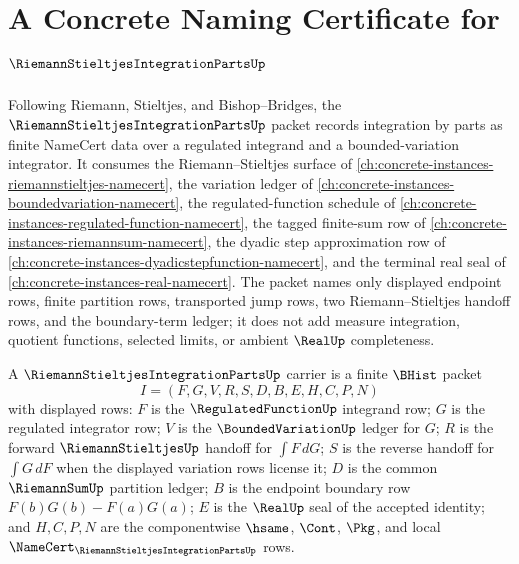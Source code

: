 \chapter{A Concrete Naming Certificate for $\RiemannStieltjesIntegrationPartsUp$}
\label{ch:concrete-instances-riemann-stieltjes-integration-parts-namecert}

Following Riemann, Stieltjes, and Bishop--Bridges, the $\RiemannStieltjesIntegrationPartsUp$ packet records integration by parts as finite NameCert data over a regulated integrand and a bounded-variation integrator. It consumes the Riemann--Stieltjes surface of \autoref{ch:concrete-instances-riemannstieltjes-namecert}, the variation ledger of \autoref{ch:concrete-instances-boundedvariation-namecert}, the regulated-function schedule of \autoref{ch:concrete-instances-regulated-function-namecert}, the tagged finite-sum row of \autoref{ch:concrete-instances-riemannsum-namecert}, the dyadic step approximation row of \autoref{ch:concrete-instances-dyadicstepfunction-namecert}, and the terminal real seal of \autoref{ch:concrete-instances-real-namecert}. The packet names only displayed endpoint rows, finite partition rows, transported jump rows, two Riemann--Stieltjes handoff rows, and the boundary-term ledger; it does not add measure integration, quotient functions, selected limits, or ambient $\RealUp$ completeness.

\begin{definition}
\label{def:riemann-stieltjes-integration-parts-carrier}
A $\RiemannStieltjesIntegrationPartsUp$ carrier is a finite $\BHist$ packet
$$
I=(F,G,V,R,S,D,B,E,H,C,P,N)
$$
with displayed rows: $F$ is the $\RegulatedFunctionUp$ integrand row; $G$ is the regulated integrator row; $V$ is the $\BoundedVariationUp$ ledger for $G$; $R$ is the forward $\RiemannStieltjesUp$ handoff for $\int F\,dG$; $S$ is the reverse handoff for $\int G\,dF$ when the displayed variation rows license it; $D$ is the common $\RiemannSumUp$ partition ledger; $B$ is the endpoint boundary row $F(b)G(b)-F(a)G(a)$; $E$ is the $\RealUp$ seal of the accepted identity; and $H,C,P,N$ are the componentwise $\hsame$, $\Cont$, $\Pkg$, and local $\NameCert_{\RiemannStieltjesIntegrationPartsUp}$ rows.
\end{definition}

